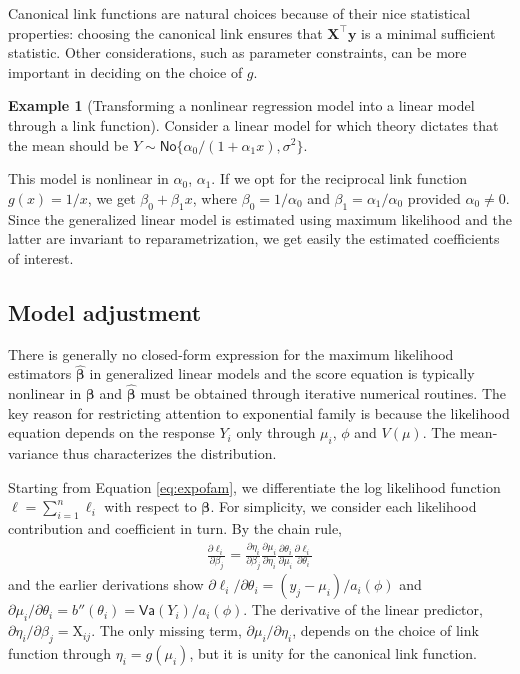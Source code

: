 \documentclass[
  11pt,
  letterpaper,
]{book}
\theoremstyle{definition}
\theoremstyle{definition}
\newtheorem{example}{Example}[chapter]
\theoremstyle{definition}
\theoremstyle{remark}
\begin{document}
Canonical link functions are natural choices because of their nice
statistical properties: choosing the canonical link ensures that
\(\mathbf{X}^\top\boldsymbol{y}\) is a minimal sufficient statistic. Other
considerations, such as parameter constraints, can be more important in
deciding on the choice of \(g\).

\begin{example}[Transforming a nonlinear regression model into a linear model through a link function]
\protect\hypertarget{exm:inverslinklm}{}{\label{exm:inverslinklm} {} }
Consider a linear model for which theory dictates that the mean should be \(Y \sim \mathsf{No}\{\alpha_0/(1+\alpha_1x), \sigma^2\}\).

This model is nonlinear in \(\alpha_0\), \(\alpha_1\). If we opt for the reciprocal link function \(g(x)=1/x\), we get \(\beta_0+\beta_1 x\), where \(\beta_0 = 1/\alpha_0\) and \(\beta_1 = \alpha_1/\alpha_0\) provided \(\alpha_0 \neq 0\). Since the generalized linear model is estimated using maximum likelihood and the latter are invariant to reparametrization, we get easily the estimated coefficients of interest.
\end{example}

\hypertarget{model-adjustment}{%
\subsection{Model adjustment}\label{model-adjustment}}

There is generally no closed-form expression for the maximum likelihood
estimators \(\widehat{\boldsymbol{\beta}}\) in generalized linear models
and the score equation is typically nonlinear in \(\boldsymbol{\beta}\)
and \(\widehat{\boldsymbol{\beta}}\) must be obtained through iterative
numerical routines. The key reason for restricting attention to
exponential family is because the likelihood equation depends on the
response \(Y_i\) only through \(\mu_i\), \(\phi\) and \(V(\mu)\). The mean-variance thus characterizes the distribution.

Starting from Equation \eqref{eq:expofam}, we differentiate the log likelihood function \(\ell = \sum_{i=1}^n \ell_i\) with respect to
\(\boldsymbol{\beta}\). For simplicity, we consider each likelihood
contribution and coefficient in turn. By the chain rule, \begin{align*}
\frac{\partial \ell_i}{\partial \beta_j} = \frac{\partial
\eta_i}{\partial \beta_j} \frac{\partial \mu_i}{\partial \eta_i}
\frac{\partial \theta_i}{\partial \mu_i}\frac{\partial
\ell_i}{\partial \theta_i}
\end{align*}
and the earlier derivations show \(\partial \ell_i/\partial \theta_i = (y_j-\mu_i)/a_i(\phi)\) and \(\partial \mu_i / \partial \theta_i = b''(\theta_i) = \mathsf{Va}(Y_i)/a_i(\phi)\).
The derivative of the linear predictor,\(\partial \eta_i / \partial \beta_j = \mathrm{X}_{ij}\). The only missing term, \(\partial \mu_i/\partial \eta_i\), depends on the choice of link function through \(\eta_i = g(\mu_i)\), but it is unity for the canonical link function.
\end{document}
